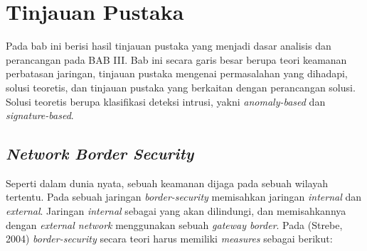 \chapter{Tinjauan Pustaka}

Pada bab ini berisi hasil tinjauan pustaka yang menjadi dasar analisis dan perancangan pada BAB III. Bab ini secara garis besar berupa teori keamanan perbatasan jaringan, tinjauan pustaka mengenai permasalahan yang dihadapi, solusi teoretis, dan tinjauan pustaka yang berkaitan dengan perancangan solusi. Solusi teoretis berupa klasifikasi deteksi intrusi, yakni \textit{anomaly-based} dan \textit{signature-based}.

\section{\textit{Network Border Security}}

Seperti dalam dunia nyata, sebuah keamanan dijaga pada sebuah wilayah tertentu. Pada sebuah jaringan \textit{border-security} memisahkan jaringan \textit{internal} dan \textit{external}. Jaringan \textit{internal} sebagai yang akan dilindungi, dan memisahkannya dengan \textit{external network} menggunakan sebuah \textit{gateway border}. Pada (Strebe, 2004) \textit{border-security} secara teori harus memiliki \textit{measures} sebagai berikut:

